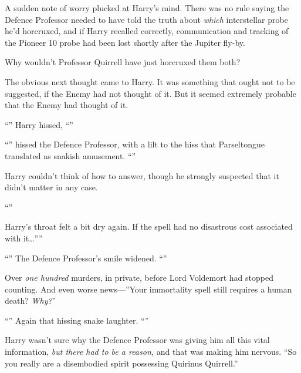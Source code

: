 A sudden note of worry plucked at Harry’s mind. There was no rule saying the
Defence Professor needed to have told the truth about \emph{which} interstellar
probe he’d horcruxed, and if Harry recalled correctly, communication and
tracking of the Pioneer 10 probe had been lost shortly after the Jupiter fly-by.

Why wouldn’t Professor Quirrell have just horcruxed them both?

The obvious next thought came to Harry. It was something that ought not to be
suggested, if the Enemy had not thought of it. But it seemed extremely probable
that the Enemy had thought of it.

“” Harry hissed, “”

“” hissed the Defence Professor, with a lilt to the hiss
that Parseltongue translated as snakish amusement. “”

Harry couldn’t think of how to answer, though he strongly suspected that it
didn’t matter in any case.

“”

Harry’s throat felt a bit dry again. If the spell had no disastrous cost
associated with it…””

“”
The Defence Professor’s smile widened. “”

Over \emph{one hundred} murders, in private, before Lord Voldemort had stopped
counting. And even worse news—”Your immortality spell still requires a human
death? \emph{Why?}”

“” Again that hissing snake laughter.
“”

Harry wasn’t sure why the Defence Professor was giving him all this vital
information, \emph{but there had to be a reason,} and that was making him
nervous. “So you really are a disembodied spirit possessing Quirinus Quirrell.”

